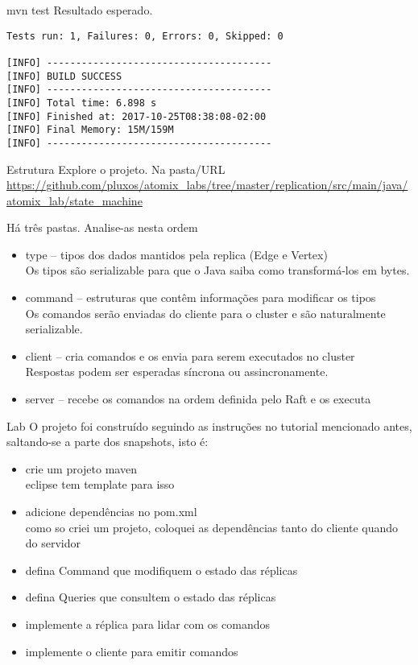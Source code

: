\begin{frame}[fragile]{mvn test}
Resultado esperado.
\begin{verbatim}
Tests run: 1, Failures: 0, Errors: 0, Skipped: 0

[INFO] ---------------------------------------
[INFO] BUILD SUCCESS
[INFO] ---------------------------------------
[INFO] Total time: 6.898 s
[INFO] Finished at: 2017-10-25T08:38:08-02:00
[INFO] Final Memory: 15M/159M
[INFO] ---------------------------------------
\end{verbatim}
\end{frame}

\begin{frame}{Estrutura}
Explore o projeto. Na pasta/URL \url{https://github.com/pluxos/atomix_labs/tree/master/replication/src/main/java/atomix_lab/state_machine}

Há três pastas. Analise-as nesta ordem
\begin{itemize}
	\item type -- tipos dos dados mantidos pela replica (Edge e Vertex)\\
	Os tipos são serializable para que o Java saiba como transformá-los em bytes.
	\item command -- estruturas que contêm informações para modificar os tipos\\
	Os comandos serão enviadas do cliente para o cluster e são naturalmente serializable.
	\item client -- cria comandos e os envia para serem executados no cluster\\
	Respostas podem ser esperadas síncrona ou assincronamente.
	\item server -- recebe os comandos na ordem definida pelo Raft e os executa
\end{itemize}
\end{frame}


\begin{frame}{Lab}
O projeto foi construído seguindo as instruções no tutorial mencionado antes, saltando-se a parte dos snapshots, isto é:
\begin{itemize}
	\item crie um projeto maven\\
	eclipse tem template para isso
	\item adicione dependências no pom.xml\\
	como so criei um projeto, coloquei as dependências tanto do cliente quando do servidor
	\item defina Command que modifiquem o estado das réplicas
	\item defina Queries que consultem o estado das réplicas
	\item implemente a réplica para lidar com os comandos
	\item implemente o cliente para emitir comandos
\end{itemize}
\end{frame}

